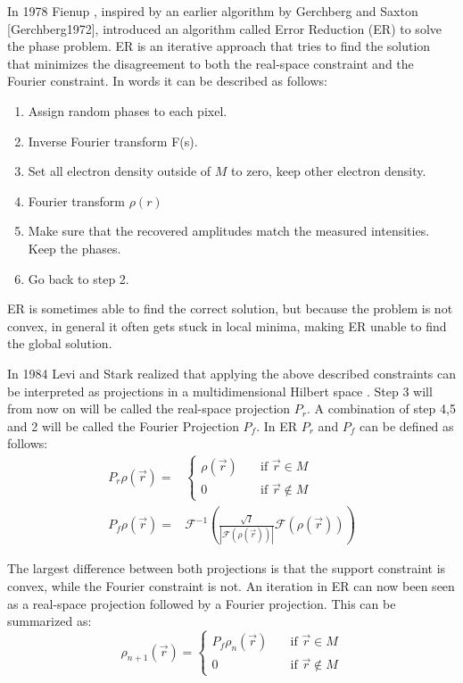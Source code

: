 In 1978 Fienup \cite{Fienup1978}, inspired by an earlier algorithm by Gerchberg and Saxton [Gerchberg1972], introduced an algorithm called Error Reduction (ER) to solve the phase problem. ER is an iterative approach that tries to find the solution that minimizes the disagreement to both the real-space constraint and the Fourier constraint. In words it can be described as follows:\\
\begin{enumerate}
\item Assign random phases to each pixel.
\item Inverse Fourier transform F(s).
\item Set all electron density outside of $M$ to zero, keep other electron density.
\item Fourier transform $\rho(r)$
\item Make sure that the recovered amplitudes match the measured intensities. Keep the phases.
\item Go back to step 2.\\
\end{enumerate}


ER is sometimes able to find the correct solution, but because the problem is not convex, in general it often gets stuck in local minima, making ER unable to find the global solution.

In 1984 Levi and Stark realized that applying the above described constraints can be interpreted as projections in a multidimensional Hilbert space \cite{Stark1984}. Step 3 will from now on will be called the real-space projection $P_r$. A combination of step 4,5 and 2 will be called the Fourier Projection $P_f$.  In ER $P_r$ and $P_f$ can be defined as follows:
\begin{align}\label{eq:ER}
P_r \rho\left(\vec{r}\right) =& \begin{cases} \rho\left(\vec{r}\right) \quad &\mathrm{if}\,\,
    \vec{r} \in M\\0 \quad & \mathrm{if}\,\, \vec{r} \not\in M \end{cases}\\
P_f \rho(\vec{r}) =& \mathcal{F}^{-1}\left( \frac{\sqrt{I}}{|\mathcal{F}(\rho(\vec{r}))|}\mathcal{F}(\rho(\vec{r})) \right)
\end{align}

The largest difference between both projections is that the support constraint is convex, while the Fourier constraint is not. An iteration in ER can now been seen as a real-space projection followed by a Fourier projection. This can be summarized as:
\begin{equation}
\rho_{n+1}\left(\vec{r}\right) = \begin{cases} P_f\rho_{n}\left(\vec{r}\right) \quad &\mathrm{if}\,\,
    \vec{r} \in M\\0 \quad & \mathrm{if}\,\, \vec{r} \not\in M \end{cases}
\end{equation}

